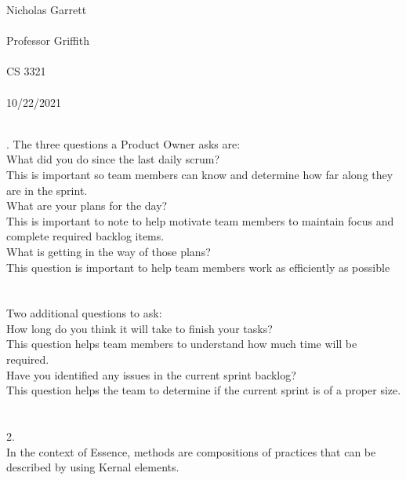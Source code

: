 \documentclass[12pt, a4paper]{article}
\begin{document}
\noindent
Nicholas Garrett\\ \\
Professor Griffith\\ \\
CS 3321\\ \\
10/22/2021\\ \\


\begin{center}
\end{center}

.
The three questions a Product Owner asks are: \\

What did you do since the last daily scrum?\\
	This is important so team members can know and determine how far along they are in the sprint.\\ 

What are your plans for the day?\\
	This is important to note to help motivate team members to maintain focus and complete required backlog items. \\ 

What is getting in the way of those plans?\\
	This question is important to help team members work as efficiently as possible \\ \\ \\

Two additional questions to ask:\\
	
How long do you think it will take to finish your tasks?\\
	This question helps team members to understand how much time will be required.\\

Have you identified any issues in the current sprint backlog? \\
	This question helps the team to determine if the current sprint is of a proper size. \\ \\ \\


2.\\
\indent
In the context of Essence, methods are compositions of practices that can be described by using Kernal elements.\\
\end{document}
